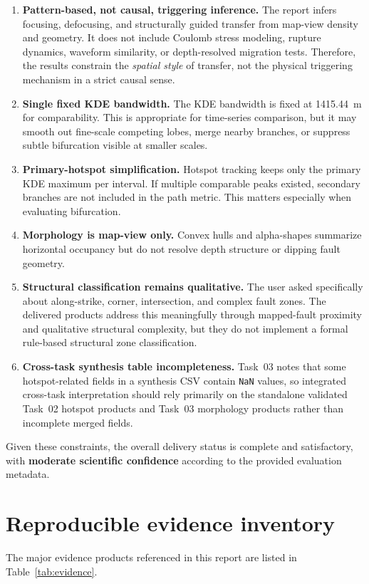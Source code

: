 \documentclass[11pt]{article}
\begin{document}
\begin{enumerate}[leftmargin=*]
    \item \textbf{Pattern-based, not causal, triggering inference.} The report infers focusing, defocusing, and structurally guided transfer from map-view density and geometry. It does not include Coulomb stress modeling, rupture dynamics, waveform similarity, or depth-resolved migration tests. Therefore, the results constrain the \emph{spatial style} of transfer, not the physical triggering mechanism in a strict causal sense.
    \item \textbf{Single fixed KDE bandwidth.} The KDE bandwidth is fixed at 1415.44~m for comparability. This is appropriate for time-series comparison, but it may smooth out fine-scale competing lobes, merge nearby branches, or suppress subtle bifurcation visible at smaller scales.
    \item \textbf{Primary-hotspot simplification.} Hotspot tracking keeps only the primary KDE maximum per interval. If multiple comparable peaks existed, secondary branches are not included in the path metric. This matters especially when evaluating bifurcation.
    \item \textbf{Morphology is map-view only.} Convex hulls and alpha-shapes summarize horizontal occupancy but do not resolve depth structure or dipping fault geometry.
    \item \textbf{Structural classification remains qualitative.} The user asked specifically about along-strike, corner, intersection, and complex fault zones. The delivered products address this meaningfully through mapped-fault proximity and qualitative structural complexity, but they do not implement a formal rule-based structural zone classification.
    \item \textbf{Cross-task synthesis table incompleteness.} Task~03 notes that some hotspot-related fields in a synthesis CSV contain \texttt{NaN} values, so integrated cross-task interpretation should rely primarily on the standalone validated Task~02 hotspot products and Task~03 morphology products rather than incomplete merged fields.
\end{enumerate}

Given these constraints, the overall delivery status is complete and satisfactory, with \textbf{moderate scientific confidence} according to the provided evaluation metadata.

\section{Reproducible evidence inventory}
The major evidence products referenced in this report are listed in Table~\ref{tab:evidence}.
\end{document}
